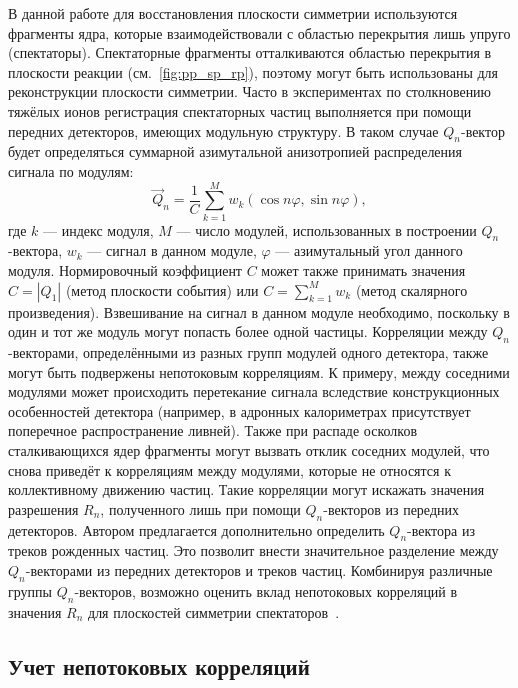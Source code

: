 В данной работе для восстановления плоскости симметрии используются фрагменты ядра, которые взаимодействовали с областью перекрытия лишь упруго (спектаторы). 
Спектаторные фрагменты отталкиваются областью перекрытия в плоскости реакции (см.~\ref{fig:pp_sp_rp}), поэтому могут быть использованы для реконструкции плоскости симметрии. 
Часто в экспериментах по столкновению тяжёлых ионов регистрация спектаторных частиц выполняется при помощи передних детекторов, имеющих модульную структуру. 
В таком случае $Q_n$-вектор будет определяться суммарной азимутальной анизотропией распределения сигнала по модулям:
%
\begin{equation}
    \vec{Q}_n  = \frac{1}{C} \sum_{k=1}^M w_k ( \cos n \varphi, \sin n \varphi ),
    \label{eq:module_qn}
\end{equation}
%
где $k$ --- индекс модуля, $M$ --- число модулей, использованных в построении $Q_n$-вектора, $w_k$ --- сигнал в данном модуле, $\varphi$ --- азимутальный угол данного модуля. 
Нормировочный коэффициент $C$ может также принимать значения $C=|Q_1|$ (метод плоскости события) или $C=\sum_{k=1}^M w_k$ (метод скалярного произведения).
Взвешивание на сигнал в данном модуле необходимо, поскольку в один и тот же модуль могут попасть более одной частицы.
Корреляции между $Q_n$-векторами, определёнными из разных групп модулей одного детектора, также могут быть подвержены непотоковым корреляциям.
К примеру, между соседними модулями может происходить перетекание сигнала вследствие конструкционных особенностей детектора (например, в адронных калориметрах присутствует поперечное распространение ливней).
Также при распаде осколков сталкивающихся ядер фрагменты могут вызвать отклик соседних модулей, что снова приведёт к корреляциям между модулями, которые не относятся к коллективному движению частиц.
Такие корреляции могут искажать значения разрешения $R_n$, полученного лишь при помощи $Q_n$-векторов из передних детекторов.
Автором предлагается дополнительно определить $Q_n$-вектора из треков рожденных частиц.
Это позволит внести значительное разделение между $Q_n$-векторами из передних детекторов и треков частиц.
Комбинируя различные группы $Q_n$-векторов, возможно оценить вклад непотоковых корреляций в значения $R_n$ для плоскостей симметрии спектаторов~\cite{Mamaev:2023fpr,Mamaev:2023yhz,Mamaev:2024}.

\subsection{Учет непотоковых корреляций}

